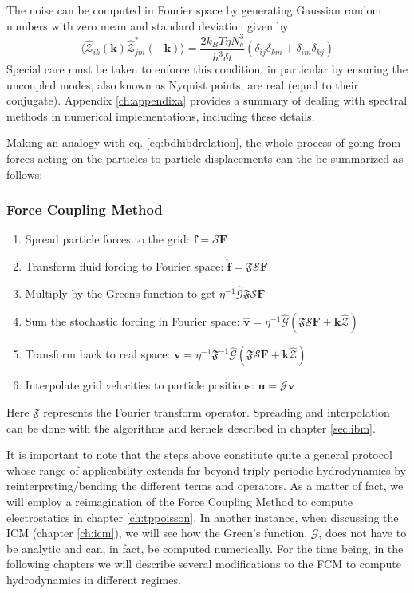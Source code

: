 \documentclass[ twoside,openright,titlepage,numbers=noenddot,%
headinclude,footinclude,cleardoublepage=empty,abstract=on,
BCOR=5mm,paper=a4,fontsize=11pt, dvipsnames
]{scrreprt}
\renewcommand{\vec}[1]{\bm{#1}}
\newcommand{\tens}[1]{\bm{\mathcal{#1}}}
\newcommand{\oper}[1]{\mathcal{#1}}
\newcommand{\dt}{\delta t}
\newcommand{\kT}{k_B T}
\newcommand{\fou}[1]{\widehat{#1}}
\newcommand{\pvel}{u}
\newcommand{\fvel}{v}
\begin{document}
The noise can be computed in Fourier space by generating Gaussian random numbers with zero mean and standard deviation given by
\begin{equation}
  \langle \fou{\mathcal{Z}}_{ik}(\vec{k})\fou{\mathcal{Z}}^*_{jm} (-\vec{k})\rangle = \frac{2\kT\eta N_c^3}{ h^3 \dt}(\delta_{ij}\delta_{km} + \delta_{im}\delta_{kj})
\end{equation}
Special care must be taken to enforce this condition, in particular by ensuring the uncoupled modes, also known as Nyquist points, are real (equal to their conjugate). Appendix \ref{ch:appendixa} provides a summary of dealing with spectral methods in numerical implementations, including these details.

Making an analogy with eq. \eqref{eq:bdhibdrelation}, the whole process of going from forces acting on the particles to particle displacements can the be summarized as follows:
\subsubsection*{Force Coupling Method}
\begin{enumerate}
\item Spread particle forces to the grid: $\vec{f} = \oper{S}\vec{F}$
\item Transform fluid forcing to Fourier space: $\fou{\vec{f}} = \mathfrak{F}\oper{S}\vec{F}$
\item Multiply by the Greens function to get $\eta^{-1}\fou{\tens{G}}\mathfrak{F}\oper{S}\vec{F}$
\item Sum the stochastic forcing in Fourier space: $\fou{\vec{\fvel}} = \eta^{-1}\fou{\tens{G}}(\mathfrak{F}\oper{S}\vec{F} + \vec{k}\fou{\mathcal{Z}})$
\item Transform back to real space: $\vec{\fvel} = \eta^{-1}\mathfrak{F}^{-1}\fou{\tens{G}}(\mathfrak{F}\oper{S}\vec{F} + \vec{k}\fou{\mathcal{Z}})$
\item Interpolate grid velocities to particle positions: $\vec{\pvel} = \oper{J}\vec{\fvel}$
\end{enumerate}
Here $\mathfrak{F}$ represents the Fourier transform operator.
Spreading and interpolation can be done with the algorithms and kernels described in chapter \ref{sec:ibm}. 

It is important to note that the steps above constitute quite a general protocol whose range of applicability extends far beyond triply periodic hydrodynamics by reinterpreting/bending the different terms and operators. As a matter of fact, we will employ a reimagination of the Force Coupling Method to compute electrostatics in chapter \ref{ch:tppoisson}. In another instance, when discussing the \gls{ICM} (chapter \ref{ch:icm}), we will see how the Green's function, $\tens{G}$, does not have to be analytic and can, in fact, be computed numerically. For the time being, in the following chapters we will describe several modifications to the \gls{FCM} to compute hydrodynamics in different regimes.
\end{document}
